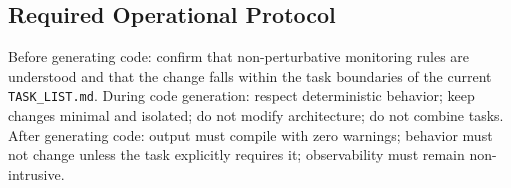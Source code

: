 \subsection{Required Operational Protocol}

Before generating code: confirm that non-perturbative monitoring rules are
understood and that the change falls within the task boundaries of the
current \texttt{TASK\_LIST.md}. During code generation: respect deterministic
behavior; keep changes minimal and isolated; do not modify architecture; do
not combine tasks. After generating code: output must compile with zero
warnings; behavior must not change unless the task explicitly requires it;
observability must remain non-intrusive.

